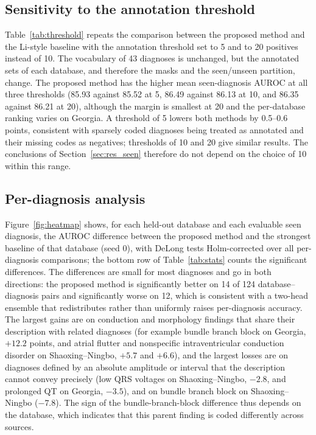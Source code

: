 \subsection{Sensitivity to the annotation threshold}\label{sec:res_threshold}
Table~\ref{tab:threshold} repeats the comparison between the proposed method and the Li-style baseline with the annotation threshold set to 5 and to 20 positives instead of 10. The vocabulary of 43 diagnoses is unchanged, but the annotated sets of each database, and therefore the masks and the seen/unseen partition, change. The proposed method has the higher mean seen-diagnosis AUROC at all three thresholds (85.93 against 85.52 at 5, 86.49 against 86.13 at 10, and 86.35 against 86.21 at 20), although the margin is smallest at 20 and the per-database ranking varies on Georgia. A threshold of 5 lowers both methods by 0.5--0.6 points, consistent with sparsely coded diagnoses being treated as annotated and their missing codes as negatives; thresholds of 10 and 20 give similar results. The conclusions of Section~\ref{sec:res_seen} therefore do not depend on the choice of 10 within this range.



\subsection{Per-diagnosis analysis}\label{sec:res_perlabel}
Figure~\ref{fig:heatmap} shows, for each held-out database and each evaluable seen diagnosis, the AUROC difference between the proposed method and the strongest baseline of that database (seed 0), with DeLong tests Holm-corrected over all per-diagnosis comparisons; the bottom row of Table~\ref{tab:stats} counts the significant differences. The differences are small for most diagnoses and go in both directions: the proposed method is significantly better on 14 of 124 database--diagnosis pairs and significantly worse on 12, which is consistent with a two-head ensemble that redistributes rather than uniformly raises per-diagnosis accuracy. The largest gains are on conduction and morphology findings that share their description with related diagnoses (for example bundle branch block on Georgia, $+12.2$ points, and atrial flutter and nonspecific intraventricular conduction disorder on Shaoxing--Ningbo, $+5.7$ and $+6.6$), and the largest losses are on diagnoses defined by an absolute amplitude or interval that the description cannot convey precisely (low QRS voltages on Shaoxing--Ningbo, $-2.8$, and prolonged QT on Georgia, $-3.5$), and on bundle branch block on Shaoxing--Ningbo ($-7.8$). The sign of the bundle-branch-block difference thus depends on the database, which indicates that this parent finding is coded differently across sources.


